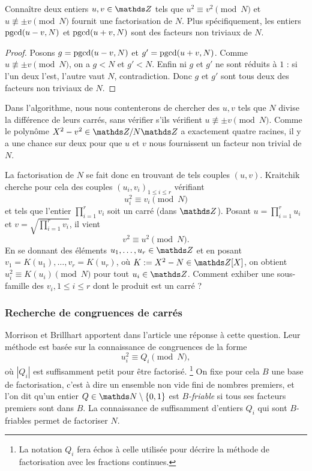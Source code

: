 \begin{lemme}
	Connaître deux entiers $u, v \in \Z$ tels que $u^2 \equiv v^2 
	\pmod{N}$ et $u\not\equiv \pm v\pmod{N}$ fournit une factorisation de $N$.
	Plus spécifiquement, les entiers $\operatorname{pgcd}(u-v, N)$ et $\operatorname{pgcd}(u+v, N)$ sont
	des facteurs non triviaux de $N$.
\end{lemme}

\begin{proof}
	Posons $g =\operatorname{pgcd}(u-v, N)$ et $g' = \operatorname{pgcd}(u+v, N)$. Comme $u\not\equiv \pm
	v\pmod{N}$, on a $g<N$ et $g'<N$. Enfin ni $g$ et $g'$ ne sont réduits à
	$1$ : si l'un deux l'est, l'autre vaut $N$, contradiction. Donc $g$ et $g'$
	sont tous deux des facteurs non triviaux de $N$.
\end{proof}

\begin{remarque}
	Dans l'algorithme, nous nous contenterons de chercher des $u, v$ tels que
	$N$ divise la différence de leurs carrés, sans vérifier s'ils vérifient $u
	\not\equiv \pm v\pmod{N}$. Comme le polynôme $X^2 - v^2 \in \Z/N\Z$ a
    exactement quatre racines, il y a \og{} une chance sur deux \fg{}  pour que
	$u$ et $v$ nous fournissent un facteur non trivial de $N$. \\
\end{remarque}

La factorisation de $N$ se fait donc en trouvant de tels couples $(u, v)$.
Kraitchik cherche pour cela des couples $(u_i, v_i)_{1\leq i \leq r}$ vérifiant
\[u_i^2 \equiv v_i \pmod{N}\] et tels que l'entier $\prod_{i=1}^r v_i$ soit un
carré (dans $\Z$). Posant $u = \prod_{i=1}^r u_i$ et $v = \sqrt{\prod_{i=1}^r
v_i}$, il vient \[v^2\equiv u^2 \pmod{N}.\] En se donnant des éléments $u_1,
\dots, u_r\in \Z$ et en posant $v_1 = K(u_1), \dots, v_r = K(u_r)$, où $K :=
X^2 - N \in \Z[X]$, on obtient $u_i^2 \equiv K(u_i) \pmod{N}$ pour tout
$u_i \in \Z$. Comment exhiber une sous-famille des $v_i, 1\leq i\leq r$ dont le
produit est un carré ?

\subsubsection{Recherche de congruences de carrés}

Morrison et Brillhart apportent dans l'article  une réponse à cette
question. Leur méthode est basée sur la connaissance de congruences de la forme
\[u_i^2 \equiv Q_i \pmod{N},\] où $| Q_i |$ est suffisamment petit pour être 
factorisé. \footnote{La notation $Q_i$ fera échos à celle utilisée pour décrire
la méthode de factorisation avec les fractions continues.} 
On fixe pour cela $B$ une base de factorisation, c'est à dire un ensemble non 
vide fini de nombres premiers, et l'on dit qu'un entier $Q\in \N\setminus
\{0, 1\}$ est \emph{$B$-friable} si tous ses facteurs premiers sont dans $B$.
La connaissance de suffisamment d'entiers $Q_i$ qui sont $B$-friables permet
de factoriser $N$.

